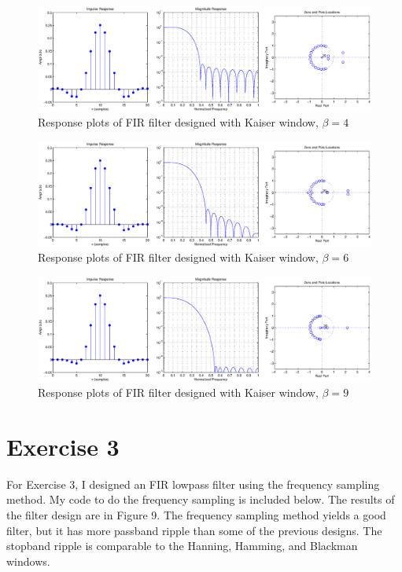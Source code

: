 \documentclass{article}
\begin{document}
\begin{figure}[htbp]
\centering
\includegraphics[width=6in]{project7_06.eps}
\caption{Response plots of FIR filter designed with Kaiser window, $\beta = 4$}
\label{fig:figure6}
\end{figure}

\begin{figure}[htbp]
\centering
\includegraphics[width=6in]{project7_07.eps}
\caption{Response plots of FIR filter designed with Kaiser window, $\beta = 6$}
\label{fig:figure7}
\end{figure}

\begin{figure}[htbp]
\centering
\includegraphics[width=6in]{project7_08.eps}
\caption{Response plots of FIR filter designed with Kaiser window, $\beta = 9$}
\label{fig:figure8}
\end{figure}

\newpage
\section*{Exercise 3}
\begin{par}
For Exercise 3, I designed an FIR lowpass filter using the frequency sampling method.  My code to do the frequency sampling is included below.  The results of the filter design are in Figure 9.  The frequency sampling method yields a good filter, but it has more passband ripple than some of the previous designs.  The stopband ripple is comparable to the Hanning, Hamming, and Blackman windows.
\end{par}
\end{document}
